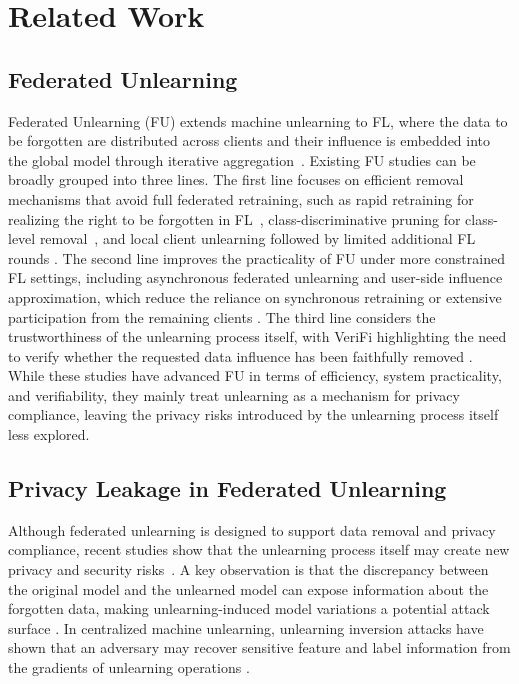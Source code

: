 




\section{Related Work} \label{related_w}


 
\subsection{Federated Unlearning}

Federated Unlearning (FU) extends machine unlearning \citep{bourtoule2021machine, wang2023machine, nguyen2020variational} to FL, where the data to be forgotten are distributed across clients and their influence is embedded into the global model through iterative aggregation~\citep{ding2024strategic,liu2022right}. Existing FU studies can be broadly grouped into three lines. The first line focuses on efficient removal mechanisms that avoid full federated retraining, such as rapid retraining for realizing the right to be forgotten in FL~\citep{liu2022right}, class-discriminative pruning for class-level removal~\citep{wang2022federated}, and local client unlearning followed by limited additional FL rounds \citep{halimi2022federated}. The second line improves the practicality of FU under more constrained FL settings, including asynchronous federated unlearning and user-side influence approximation, which reduce the reliance on synchronous retraining or extensive participation from the remaining clients \citep{su2023asynchronous, wang2024fedu}. The third line considers the trustworthiness of the unlearning process itself, with VeriFi highlighting the need to verify whether the requested data influence has been faithfully removed \citep{gao2024verifi}. While these studies have advanced FU in terms of efficiency, system practicality, and verifiability, they mainly treat unlearning as a mechanism for privacy compliance, leaving the privacy risks introduced by the unlearning process itself less explored.



 

\subsection{Privacy Leakage in Federated Unlearning}

Although federated unlearning is designed to support data removal and privacy compliance, recent studies show that the unlearning process itself may create new privacy and security risks~\citep{zhou2026model}. A key observation is that the discrepancy between the original model and the unlearned model can expose information about the forgotten data, making unlearning-induced model variations a potential attack surface \citep{wang2023federated}. In centralized machine unlearning, unlearning inversion attacks have shown that an adversary may recover sensitive feature and label information from the gradients of unlearning operations \citep{hu2024learn}. 


